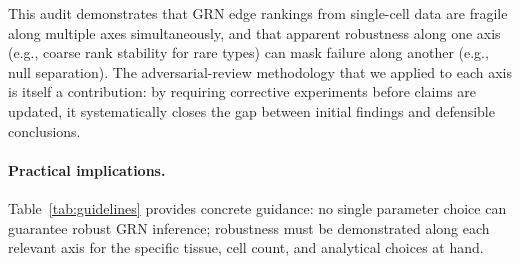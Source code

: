 \documentclass[unnumsec,webpdf,contemporary,large,namedate]{oup-authoring-template}
\begin{document}
This audit demonstrates that GRN edge rankings from single-cell data are fragile
along multiple axes simultaneously, and that apparent robustness along one axis
(e.g., coarse rank stability for rare types) can mask failure along another
(e.g., null separation). The adversarial-review methodology that we applied to
each axis is itself a contribution: by requiring corrective experiments before
claims are updated, it systematically closes the gap between initial findings and
defensible conclusions.

\paragraph{Practical implications.}
Table~\ref{tab:guidelines} provides concrete guidance: no single
parameter choice can guarantee robust GRN inference; robustness must
be demonstrated along each relevant axis for the specific tissue,
cell count, and analytical choices at hand.
\end{document}
